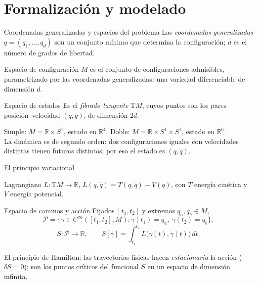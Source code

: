 \documentclass[aspectratio=169,11pt]{beamer}
\newcommand{\R}{\mathbb{R}}
\newcommand{\TM}{\mathrm{T}M}
\begin{document}
\section{Formalización y modelado}

\begin{frame}{Coordenadas generalizadas y espacios del problema}
  Las \emph{coordenadas generalizadas} $q=(q_1,\dots,q_d)$ son un conjunto
  m\'inimo que determina la configuraci\'on; $d$ es el n\'umero de grados de libertad.
  \begin{cajadef}{Espacio de configuraci\'on}
    $M$ es el conjunto de configuraciones admisibles, parametrizado por las
    coordenadas generalizadas: una variedad diferenciable de dimensi\'on $d$.
  \end{cajadef}
  \begin{cajadef}{Espacio de estados}
    Es el \emph{fibrado tangente} $\TM$, cuyos puntos son los pares
    posici\'on--velocidad $(q,\dot q)$, de dimensi\'on $2d$.
  \end{cajadef}
  \vspace{0.2em}
  \small
  Simple: $M=\R\times S^1$, estado en $\R^4$. \quad
  Doble: $M=\R\times S^1\times S^1$, estado en $\R^6$.\\
  La din\'amica es de segundo orden: dos configuraciones iguales con velocidades
  distintas tienen futuros distintos; por eso el estado es $(q,\dot q)$.
\end{frame}

\begin{frame}{El principio variacional}
  \begin{cajadef}{Lagrangiano}
    $L:\TM\to\R$, \quad $L(q,\dot q)=T(q,\dot q)-V(q)$, con $T$ energ\'ia
    cin\'etica y $V$ energ\'ia potencial.
  \end{cajadef}
  \begin{cajadef}{Espacio de caminos y acci\'on}
    Fijados $[t_1,t_2]$ y extremos $q_a,q_b\in M$,
    \[
      \mathcal{P}=\{\gamma\in C^{\infty}([t_1,t_2],M):\gamma(t_1)=q_a,\ \gamma(t_2)=q_b\},
    \]
    \[
      S:\mathcal{P}\longrightarrow\R,\qquad
      S[\gamma]=\int_{t_1}^{t_2} L\bigl(\gamma(t),\dot\gamma(t)\bigr)\,dt .
    \]
  \end{cajadef}
  \small El principio de Hamilton: las trayectorias f\'isicas hacen
  \emph{estacionaria} la acci\'on ($\delta S=0$); son los puntos cr\'iticos del
  funcional $S$ en un espacio de dimensi\'on infinita.
\end{frame}
\end{document}
